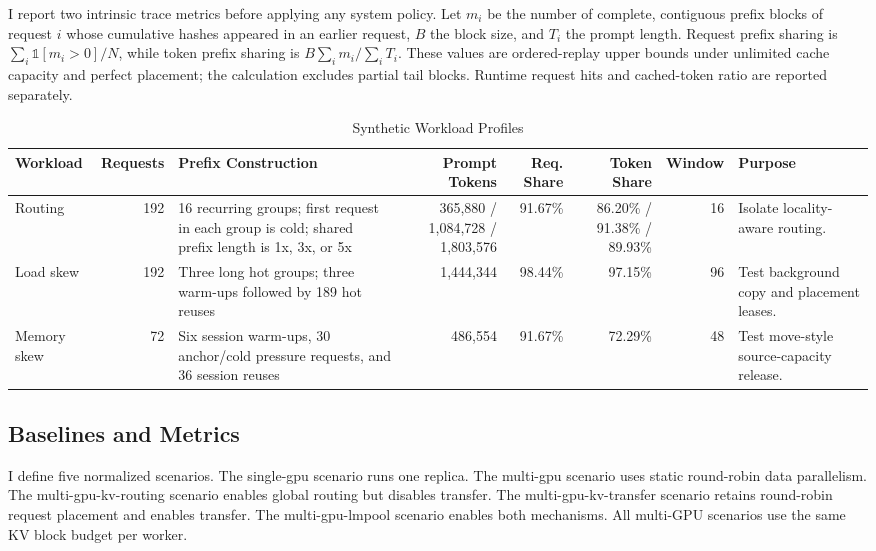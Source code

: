 \documentclass{article}
\begin{document}
I report two intrinsic trace metrics before applying any system policy. Let $m_i$ be the number of complete, contiguous prefix blocks of request $i$ whose cumulative hashes appeared in an earlier request, $B$ the block size, and $T_i$ the prompt length. Request prefix sharing is $\sum_i \mathbb{1}[m_i>0]/N$, while token prefix sharing is $B\sum_i m_i/\sum_i T_i$. These values are ordered-replay upper bounds under unlimited cache capacity and perfect placement; the calculation excludes partial tail blocks. Runtime request hits and cached-token ratio are reported separately.

\begin{table}[t]
  \centering
  \caption{Synthetic Workload Profiles}
  \label{tab:datasets}
  \footnotesize
  \setlength{\tabcolsep}{3pt}
  \begin{tabular}{@{}L{0.13\textwidth}rL{0.29\textwidth}rrrrL{0.19\textwidth}@{}}
    \toprule
    Workload & Requests & Prefix Construction & Prompt Tokens & Req. Share & Token Share & Window & Purpose \\
    \midrule
    Routing & 192 & 16 recurring groups; first request in each group is cold; shared prefix length is 1x, 3x, or 5x & 365,880 / 1,084,728 / 1,803,576 & 91.67\% & 86.20\% / 91.38\% / 89.93\% & 16 & Isolate locality-aware routing. \\
    Load skew & 192 & Three long hot groups; three warm-ups followed by 189 hot reuses & 1,444,344 & 98.44\% & 97.15\% & 96 & Test background copy and placement leases. \\
    Memory skew & 72 & Six session warm-ups, 30 anchor/cold pressure requests, and 36 session reuses & 486,554 & 91.67\% & 72.29\% & 48 & Test move-style source-capacity release. \\
    \bottomrule
  \end{tabular}
\end{table}

\subsection{Baselines and Metrics}

I define five normalized scenarios. The single-gpu scenario runs one replica. The multi-gpu scenario uses static round-robin data parallelism. The multi-gpu-kv-routing scenario enables global routing but disables transfer. The multi-gpu-kv-transfer scenario retains round-robin request placement and enables transfer. The multi-gpu-lmpool scenario enables both mechanisms. All multi-GPU scenarios use the same KV block budget per worker.
\end{document}
